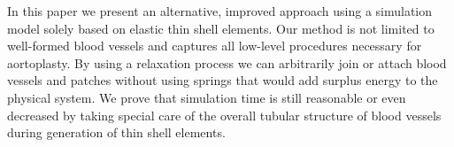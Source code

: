 In this paper we present an \stefan{(}alternative\stefan{)}, improved approach using a simulation model solely based on elastic thin shell elements. Our method is not limited to well-formed blood vessels and captures all low-level procedures necessary for aortoplasty. By using a relaxation process we can arbitrarily join or attach blood vessels and patches without using springs that would add surplus energy to the physical system. We prove that simulation time is still reasonable or even decreased by taking special care of the overall tubular structure of blood vessels during generation of thin shell elements.
%
%
%
%
% 
%
